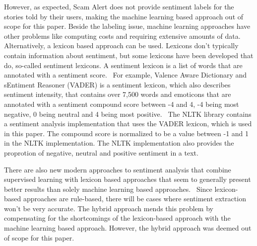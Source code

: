 However, as expected, Scam Alert does not provide sentiment labels for the stories told by their users, making the machine learning based approach out of scope for this paper. Beside the labeling issue, machine learning approaches have other problems like computing costs and requiring extensive amounts of data.~\cite{hutto2014vader} Alternatively, a lexicon based approach can be used. Lexicons don't typically contain information about sentiment, but some lexicons have been developed that do, so-called sentiment lexicons. A sentiment lexicon is a list of words that are annotated with a sentiment score.~\cite{bonta2019comprehensive} For example, Valence Aware Dictionary and sEntiment Reasoner (VADER) is a sentiment lexicon, which also describes sentiment intensity, that contains over 7,500 words and emoticons that are annotated with a sentiment compound score between -4 and 4, -4 being most negative, 0 being neutral and 4 being most positive.~\cite{hutto2014vader} The NLTK library contains a sentiment analysis implementation that uses the VADER lexicon, which is used in this paper. The compound score is normalized to be a value between -1 and 1 in the NLTK implementation. The NLTK implementation also provides the proprotion of negative, neutral and positive sentiment in a text.

\begin{table}
    \centering
    \caption{Examples of sentiment analysis results on different unprocessed texts.}
    \label{tab:sentiment_analysis_results}
\end{table}

There are also new modern approaches to sentiment analysis that combine supervised learning with lexicon based approaches that seem to generally present better results than solely machine learning based approaches.~\cite{ahmad2017hybrid} Since lexicon-based approaches are rule-based, there will be cases where sentiment extraction won't be very accurate. The hybrid approach mends this problem by compensating for the shortcomings of the lexicon-based approach with the machine learning based approach. However, the hybrid approach was deemed out of scope for this paper.

